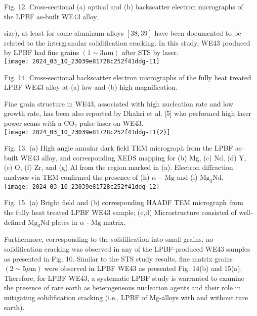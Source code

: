 \documentclass[10pt]{article}
\begin{document}
Fig. 12. Cross-sectional (a) optical and (b) backscatter electron micrographs of the LPBF as-built WE43 alloy.

size), at least for some aluminum alloys $[38,39]$ have been documented to be related to the intergranular solidification cracking. In this study, WE43 produced by LPBF had fine grains $(1 \sim 3 \mu \mathrm{m})$ after STS by laser.\\
\texttt{[image: 2024\_03\_10\_23039e81728c252f41ddg-11]}

Fig. 14. Cross-sectional backscatter electron micrographs of the fully heat treated LPBF WE43 alloy at (a) low and (b) high magnification.

Fine grain structure in WE43, associated with high nucleation rate and low growth rate, has been also reported by Dhahri et al. [5] who performed high laser power scans with a $\mathrm{CO}_{2}$ pulse laser on WE43.\\
\texttt{[image: 2024\_03\_10\_23039e81728c252f41ddg-11(2)]}

Fig. 13. (a) High angle annular dark field TEM micrograph from the LPBF as-built WE43 alloy, and corresponding XEDS mapping for (b) Mg, (c) Nd, (d) Y, (e) O, (f) $\mathrm{Zr}$, and (g) Al from the region marked in (a). Electron diffraction analyses via TEM confirmed the presence of (h) $\alpha-\mathrm{Mg}$ and (i) $\mathrm{Mg}_{3} \mathrm{Nd}$.\\
\texttt{[image: 2024\_03\_10\_23039e81728c252f41ddg-12]}

Fig. 15. (a) Bright field and (b) corresponding HAADF TEM micrograph from the fully heat treated LPBF WE43 sample; (c,d) Microstructure consisted of well-defined $\mathrm{Mg}_{3} \mathrm{Nd}$ plates in $\alpha$ - $\mathrm{Mg}$ matrix.

Furthermore, corresponding to the solidification into small grains, no solidification cracking was observed in any of the LPBF-produced WE43 samples as presented in Fig. 10. Similar to the STS study results, fine matrix grains $(2 \sim 5 \mu \mathrm{m})$ were observed in LPBF WE43 as presented Fig. 14(b) and 15(a). Therefore, for LPBF WE43, a systematic LPBF study is warranted to examine the presence of rare earth as heterogeneous nucleation agents and their role in mitigating solidification cracking (i.e., LPBF of Mg-alloys with and without rare earth).
\end{document}
